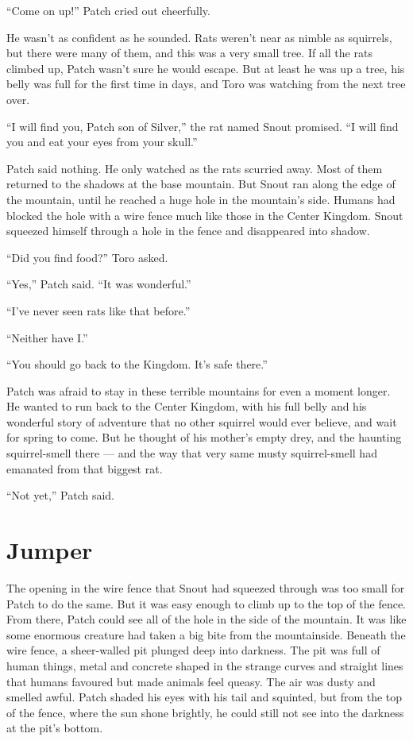 \documentclass[ebook,oneside,openany,17pt]{memoir}
\newenvironment{tolerant}[1]{%
  \par\tolerance=#1\relax
}{%
  \par
}
\renewcommand{\thechapter}{\Roman{chapter}}
\newcounter{sections}
\newcommand{\sections}[1]{%
  \section*{#1}
  \addtocounter{sections}{1}%
  \pdfbookmark[1]{#1}{section.\thechapter.\thesections}}
\begin{document}
“Come on up!” Patch cried out cheerfully.

\begin{tolerant}{2000}
He wasn’t as confident as he sounded. Rats weren’t near as nimble as
squirrels, but there were many of them, and this was a very small
tree. If all the rats climbed up, Patch wasn’t sure he would
escape. But at least he was up a tree, his belly was full for the
first time in days, and Toro was watching from the next tree over.
\end{tolerant}

\begin{tolerant}{1000}
“I will find you, Patch son of Silver,” the rat named Snout
promised. “I will find you and eat your eyes from your skull.”
\end{tolerant}

\begin{tolerant}{2000}
Patch said nothing. He only watched as the rats scurried away. Most of
them returned to the shadows at the base mountain. But Snout ran along
the edge of the mountain, until he reached a huge hole in the
mountain’s side. Humans had blocked the hole with a wire fence much
like those in the Center Kingdom. Snout squeezed himself through a
hole in the fence and disappeared into shadow.
\end{tolerant}

“Did you find food?” Toro asked.

“Yes,” Patch said. “It was wonderful.”

“I’ve never seen rats like that before.”

“Neither have I.”

“You should go back to the Kingdom. It’s safe there.”

Patch was afraid to stay in these terrible mountains for even a moment
longer. He wanted to run back to the Center Kingdom, with his full
belly and his wonderful story of adventure that no other squirrel
would ever believe, and wait for spring to come. But he thought of his
mother’s empty drey, and the haunting squirrel-smell there — and the
way that very same musty squirrel-smell had emanated from that biggest
rat.

“Not yet,” Patch said.


\sections{Jumper}

\begin{tolerant}{2000}
The opening in the wire fence that Snout had squeez\-ed through was too
small for Patch to do the same. But it was easy enough to climb up to
the top of the fence. From there, Patch could see all of the hole in
the side of the mountain. It was like some enormous creature had taken
a big bite from the mountainside. Beneath the wire fence, a
sheer-walled pit plunged deep into darkness. The pit was full of human
things, metal and concrete shaped in the strange curves and straight
lines that humans favoured but made animals feel queasy. The air was
dusty and smelled awful. Patch shaded his eyes with his tail and
squinted, but from the top of the fence, where the sun shone brightly,
he could still not see into the darkness at the pit’s bottom.
\end{tolerant}
\end{document}
